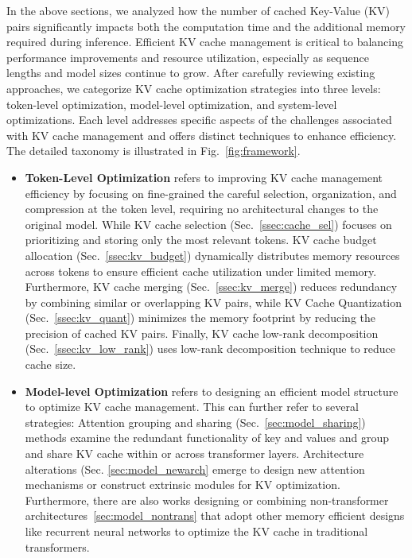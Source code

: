 In the above sections, we analyzed how the number of cached Key-Value (KV) pairs significantly impacts both the computation time and the additional memory required during inference. Efficient KV cache management is critical to balancing performance improvements and resource utilization, especially as sequence lengths and model sizes continue to grow.
After carefully reviewing existing approaches, we categorize KV cache optimization strategies into three levels: token-level optimization, model-level optimization, and system-level optimizations. 
Each level addresses specific aspects of the challenges associated with KV cache management and offers distinct techniques to enhance efficiency.
The detailed taxonomy is illustrated in  Fig.~\ref{fig:framework}. 
\begin{itemize}[leftmargin=8pt]
    \item \textbf{Token-Level Optimization} refers to improving KV cache management efficiency by focusing on fine-grained  the careful selection, organization, and compression  at the token level, requiring no architectural changes to the original model.    
    While KV cache selection (Sec.~\ref{ssec:cache_sel}) focuses on prioritizing and storing only the most relevant tokens. 
    KV cache budget allocation (Sec.~\ref{ssec:kv_budget}) dynamically distributes memory resources across tokens to ensure efficient cache utilization under limited memory. 
    Furthermore, KV cache merging (Sec.~\ref{ssec:kv_merge}) reduces redundancy by combining similar or overlapping KV pairs, while KV Cache Quantization (Sec.~\ref{ssec:kv_quant}) minimizes the memory footprint by reducing the precision of cached KV pairs. 
    Finally, KV cache low-rank decomposition (Sec.~\ref{ssec:kv_low_rank}) uses  low-rank decomposition technique to reduce cache size.
    
    \item \textbf{Model-level Optimization} refers to designing an efficient model structure to optimize KV cache management. This can further refer to several strategies: Attention grouping and sharing (Sec.~\ref{sec:model_sharing}) methods examine the redundant functionality of key and values and group and share KV cache within or across transformer layers. Architecture alterations (Sec. \ref{sec:model_newarch} emerge to design new attention mechanisms or construct extrinsic modules for KV optimization. Furthermore, there are also works designing or combining non-transformer architectures~\ref{sec:model_nontrans} that adopt other memory efficient designs like recurrent neural networks to optimize the KV cache in traditional transformers. 
    

\end{itemize}
